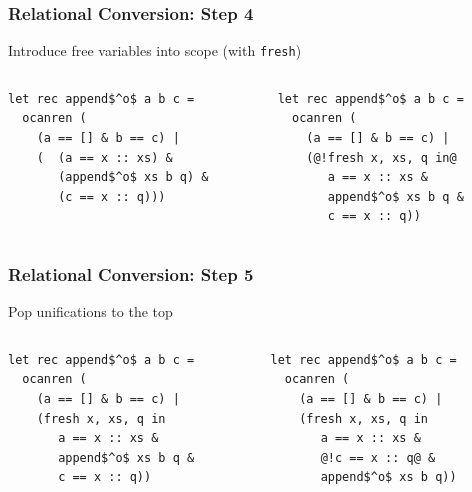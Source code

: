 \documentclass[xcolor=table]{beamer}
\begin{document}
\begin{frame}[fragile]
  \transwipe[direction=90]
  \frametitle{Relational Conversion: Step 4}
\begin{center}
Introduce free variables into scope  (with \lstinline{fresh})
\end{center}

\begin{columns}
\begin{column}{0.5\textwidth}
\begin{lstlisting}
let rec append$^o$ a b c =
  ocanren (
    (a == [] & b == c) |
    (  (a == x :: xs) &
       (append$^o$ xs b q) &
       (c == x :: q)))
\end{lstlisting}
\end{column}
\begin{column}{0.5\textwidth}
\begin{lstlisting}
let rec append$^o$ a b c =
  ocanren (
    (a == [] & b == c) |
    (@!fresh x, xs, q in@
       a == x :: xs &
       append$^o$ xs b q &
       c == x :: q))
\end{lstlisting}
\end{column}
\end{columns}
\end{frame}


\begin{frame}[fragile]
  \transwipe[direction=90]
  \frametitle{Relational Conversion: Step 5}
\begin{center}
Pop unifications to the top
\end{center}

\begin{columns}
\begin{column}{0.5\textwidth}
\begin{lstlisting}
let rec append$^o$ a b c =
  ocanren (
    (a == [] & b == c) |
    (fresh x, xs, q in
       a == x :: xs &
       append$^o$ xs b q &
       c == x :: q))
\end{lstlisting}
\end{column}
\begin{column}{0.5\textwidth}
\begin{lstlisting}
let rec append$^o$ a b c =
  ocanren (
    (a == [] & b == c) |
    (fresh x, xs, q in
       a == x :: xs &
       @!c == x :: q@ &
       append$^o$ xs b q))
\end{lstlisting}
\end{column}
\end{columns}
\end{frame}
\end{document}
